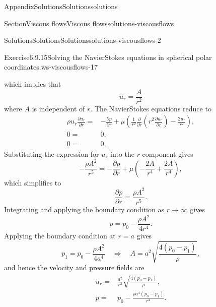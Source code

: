 \documentclass[oneside,10pt,]{book}
\numberwithin{equation}{section}
\newcommand{\pd}[2]{\frac{\partial#1}{\partial#2}}
\begin{document}
\begin{appendixptx}{Appendix}{Solutions}{}{Solutions}{}{}{solutions}
\begin{sectionptx}{Section}{Viscous flows}{}{Viscous flows}{}{}{solutions-viscousflows}
\begin{solutions-subsection-numberless}{Solutions}{Solutions}{}{Solutions}{}{}{solutions-viscousflows-2}
\begin{divisionsolution}{Exercise}{6.9.15}{Solving the Navier\textendash{}Stokes equations in spherical polar coordinates.}{ws-viscousflows-17}
\begin{enumerate}[font=\bfseries,label=(\alph*),ref=\alph*]
which implies that%
\begin{equation*}
u_r=\frac{A}{r^2}
\end{equation*}
where \(A\) is independent of \(r\). The Navier\textendash{}Stokes equations reduce to%
\begin{align*}
\rho u_r\pd{u_r}{r}=&-\pd{p}{r}+\mu\left(\frac1{r^2}\pd{}{r}\left(r^2\pd{u_r}{r}\right)-\frac{2u_r}{r^2}\right),\\
0=&0,\\
0=&0,
\end{align*}
Substituting the expression for \(u_r\) into the \(r\)-component gives%
\begin{equation*}
-\frac{\rho A^2}{r^5}=-\pd{p}{r}+\mu\left(-\frac{2A}{r^4}+\frac{2A}{r^4}\right),
\end{equation*}
which simplifies to%
\begin{equation*}
\pd{p}{r}=\frac{\rho A^2}{r^5}.
\end{equation*}
Integrating and applying the boundary condition as \(r\rightarrow\infty\) gives%
\begin{equation*}
p=p_0-\frac{\rho A^2}{4r^4}.
\end{equation*}
Applying the boundary condition at \(r=a\) gives%
\begin{equation*}
p_1=p_0-\frac{\rho A^2}{4a^4}\quad\Rightarrow\quad A=a^2\sqrt{\frac{4(p_0-p_1)}{\rho}},
\end{equation*}
and hence the velocity and pressure fields are%
\begin{align*}
u_r=&\frac{a^2}{r^2}\sqrt{\frac{4(p_0-p_1)}{\rho}},\\
p=&p_0-\frac{\rho a^4(p_0-p_1)}{r^4}.
\end{align*}
%
\end{enumerate}%
\end{divisionsolution}%
\end{solutions-subsection-numberless}
\end{sectionptx}
\end{appendixptx}
%
%
\typeout{************************************************}
\typeout{************************************************}
%
\end{document}
